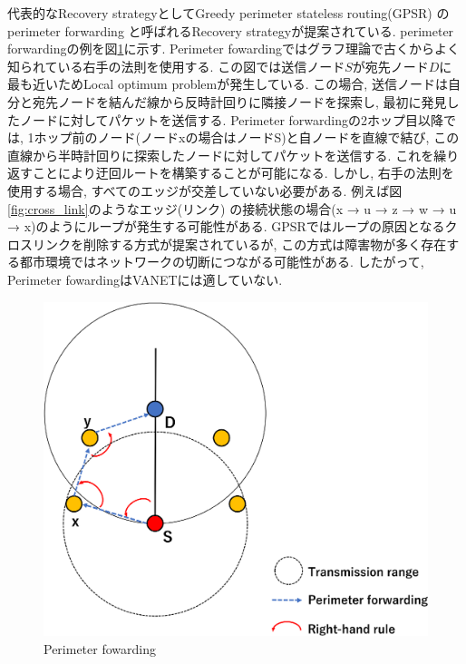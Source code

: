 \documentclass[10pt]{jreport}
\begin{document}
代表的なRecovery strategyとしてGreedy perimeter stateless routing(GPSR) \cite{6}の perimeter forwarding
と呼ばれるRecovery strategyが提案されている. perimeter forwardingの例を図\ref{fig:Perimeter}に示す. Perimeter fowardingではグラフ理論で古くからよく知られている右手の法則を使用する. この図では送信ノード$S$が宛先ノード$D$に最も近いためLocal optimum problemが発生している. この場合, 送信ノードは自分と宛先ノードを結んだ線から反時計回りに隣接ノードを探索し, 最初に発見したノードに対してパケットを送信する. Perimeter forwardingの2ホップ目以降では, 1ホップ前のノード(ノードxの場合はノードS)と自ノードを直線で結び, この直線から半時計回りに探索したノードに対してパケットを送信する. これを繰り返すことにより迂回ルートを構築することが可能になる. 
しかし, 右手の法則を使用する場合, すべてのエッジが交差していない必要がある. 例えば図\ref{fig:cross_link}のようなエッジ(リンク) の接続状態の場合(x → u → z → w → u → x)のようにループが発生する可能性がある. GPSRではループの原因となるクロスリンクを削除する方式が提案されているが, この方式は障害物が多く存在する都市環境ではネットワークの切断につながる可能性がある. したがって, Perimeter fowardingはVANETには適していない.




\begin{figure}[!ht]
	\centering
	\includegraphics[width=130mm]{figures/Perimeter.eps}
	\caption{Perimeter fowarding}
	\label{fig:Perimeter}
\end{figure}
\end{document}
